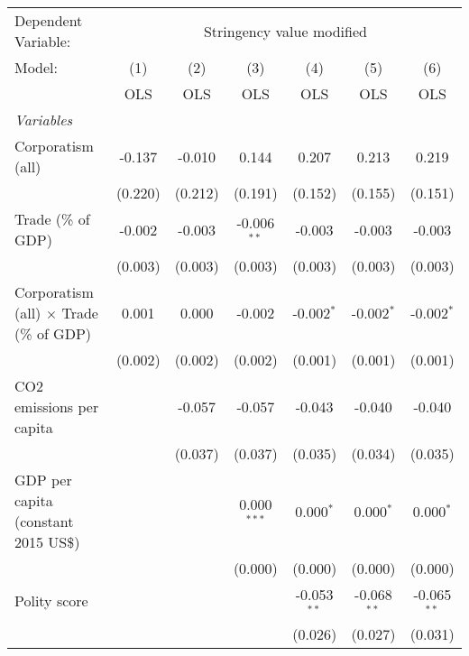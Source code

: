 
\begingroup
\centering
\begin{tabular}{lcccccc}
   \toprule
   Dependent Variable: & \multicolumn{6}{c}{Stringency value modified}\\
   Model:                                         & (1)     & (2)     & (3)           & (4)           & (5)           & (6)\\  
                                                  &  OLS    & OLS     & OLS           & OLS           & OLS           & OLS\\  
   \midrule
   \emph{Variables}\\
   Corporatism (all)                              & -0.137  & -0.010  & 0.144         & 0.207         & 0.213         & 0.219\\   
                                                  & (0.220) & (0.212) & (0.191)       & (0.152)       & (0.155)       & (0.151)\\   
   Trade (\% of GDP)                              & -0.002  & -0.003  & -0.006$^{**}$ & -0.003        & -0.003        & -0.003\\   
                                                  & (0.003) & (0.003) & (0.003)       & (0.003)       & (0.003)       & (0.003)\\   
   Corporatism (all) $\times$ Trade (\% of GDP)   & 0.001   & 0.000   & -0.002        & -0.002$^{*}$  & -0.002$^{*}$  & -0.002$^{*}$\\   
                                                  & (0.002) & (0.002) & (0.002)       & (0.001)       & (0.001)       & (0.001)\\   
   CO2 emissions per capita                       &         & -0.057  & -0.057        & -0.043        & -0.040        & -0.040\\   
                                                  &         & (0.037) & (0.037)       & (0.035)       & (0.034)       & (0.035)\\   
   GDP per capita (constant 2015 US\$)            &         &         & 0.000$^{***}$ & 0.000$^{*}$   & 0.000$^{*}$   & 0.000$^{*}$\\   
                                                  &         &         & (0.000)       & (0.000)       & (0.000)       & (0.000)\\   
   Polity score                                   &         &         &               & -0.053$^{**}$ & -0.068$^{**}$ & -0.065$^{**}$\\   
                                                  &         &         &               & (0.026)       & (0.027)       & (0.031)\\   

\end{tabular}
